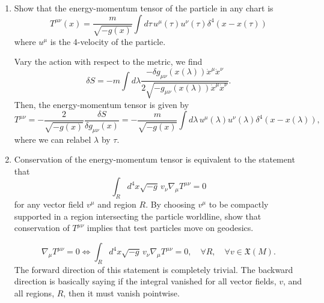 \begin{enumerate}[label=\roman*)]
\begin{solution}
    \end{solution}
    \item Show that the energy-momentum tensor of the particle in any chart is
    \begin{equation}
        T^{\mu\nu}(x) = \frac{m}{\sqrt{-g(x)}}\int d\tau\, u^\mu(\tau)u^\nu(\tau)\delta^4(x-x(\tau))
    \end{equation}
    where $u^\mu$ is the 4-velocity of the particle.
    \begin{solution}
        Vary the action with respect to the metric, we find
        \begin{equation}
            \delta S = - m \int d\lambda \frac{-\delta g_{\mu\nu}(x(\lambda))\dot{x}^\mu \dot{x}^\nu}{2\sqrt{-g_{\mu\nu}(x(\lambda))\dot{x}^\mu \dot{x}^\nu}}.
        \end{equation}
        Then, the energy-momentum tensor is given by
        \begin{equation}
            T^{\mu\nu}= -\frac{2}{\sqrt{-g(x)}}\frac{\delta S}{\delta g_{\mu\nu}(x)} = -\frac{m}{\sqrt{-g(x)}}\int d\lambda \,u^\mu(\lambda) u^\nu(\lambda)\delta^4(x-x(\lambda)),
        \end{equation}
        where we can relabel $\lambda$ by $\tau$.
    \end{solution}
    \item Conservation of the energy-momentum tensor is equivalent to the statement that
    \begin{equation}
        \int_R d^4x\sqrt{-g}\,v_\nu\nabla_\mu T^{\mu\nu} = 0
    \end{equation}
    for any vector field $v^\mu$ and region $R$. By choosing $v^\mu$ to be compactly supported in a region intersecting the particle worldline, show that conservation of $T^{\mu\nu}$ implies that test particles move on geodesics.
    \begin{solution}
        \begin{equation}
            \nabla_\mu T^{\mu\nu} = 0 \iff \int_R d^4x\sqrt{-g}\,v_\nu\nabla_\mu T^{\mu\nu} = 0, \quad \forall R, \quad     \forall v\in \mathfrak{X}(M).
        \end{equation}
        The forward direction of this statement is completely trivial. The backward direction is basically saying if the integral vanished for all vector fields, $v$, and all regions, $R$, then it must vanish pointwise.
        

\end{solution}
\end{enumerate}
